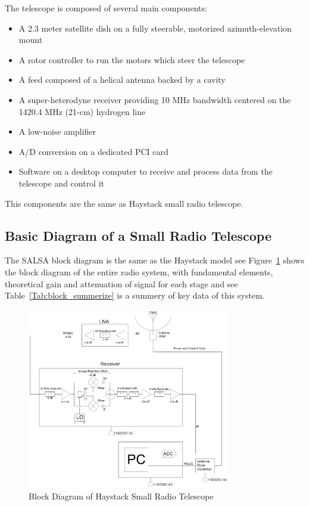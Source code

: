 \documentclass[10pt,conference]{IEEEtran}
\begin{document}
The telescope is composed of several main components:
\begin{itemize}
\item A 2.3 meter satellite dish on a fully steerable, motorized azimuth-elevation mount
\item A rotor controller to run the motors which steer the telescope
\item A feed composed of a helical antenna backed by a cavity
\item A super-heterodyne receiver providing 10 MHz bandwidth centered on the 1420.4 MHz (21-cm) hydrogen line
\item A low-noise amplifier
\item A/D conversion on a dedicated PCI card
\item Software on a desktop computer to receive and process data from the telescope and control it
\end{itemize}

This components are the same as Haystack small radio telescope\cite{DustinJohnson2012}.

\IEEEpubidadjcol

\subsection{Basic Diagram of a Small Radio Telescope}

The SALSA block diagram is the same as the Haystack model see Figure~\ref{fig:block_figure} shows the block diagram of the entire radio system, with fundamental elements, theoretical gain and attenuation of signal for each stage and see Table~\ref{Tab:block_summerize} is a summery of key data of this system\cite{DustinJohnson2012}.

\begin{figure}[htbp]
\centerline{\includegraphics[width=3.5in]{block.eps}}
\caption{Block Diagram of Haystack Small Radio Telescope}
\label{fig:block_figure}
\end{figure}
\end{document}
